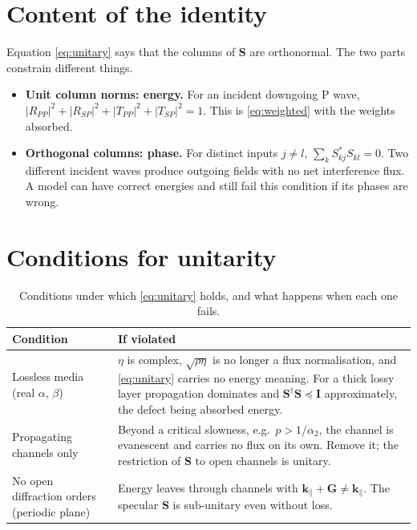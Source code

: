\documentclass[11pt,a4paper]{article}
\newcommand{\bI}{\mathbf{I}}
\newcommand{\bS}{\mathbf{S}}
\newcommand{\kpar}{\mathbf{k}_{\parallel}}
\newcommand{\herm}{^{\dagger}}
\begin{document}
\section{Content of the identity}
\label{sec:content}

Equation \eqref{eq:unitary} says that the columns of $\bS$ are
orthonormal. The two parts constrain different things.

\begin{itemize}
\item \textbf{Unit column norms: energy.} For an incident downgoing P
  wave, $|R_{PP}|^2 + |R_{SP}|^2 + |T_{PP}|^2 + |T_{SP}|^2 = 1$. This is
  \eqref{eq:weighted} with the weights absorbed.
\item \textbf{Orthogonal columns: phase.} For distinct inputs $j \neq
  l$, $\sum_k S_{kj}^{*} S_{kl} = 0$. Two different incident waves
  produce outgoing fields with no net interference flux. A model can
  have correct energies and still fail this condition if its phases are
  wrong.
\end{itemize}

\section{Conditions for unitarity}
\label{sec:conditions}

\begin{table}[h]
\centering
\caption{Conditions under which \eqref{eq:unitary} holds, and what
happens when each one fails.}
\label{tab:conditions}
\begin{tabular}{>{\raggedright}p{} >{\raggedright\arraybackslash}p{}}
\toprule
Condition & If violated \\
\midrule
Lossless media (real $\alpha$, $\beta$)
  & $\eta$ is complex, $\sqrt{\rho\eta}$ is no longer a flux
    normalisation, and \eqref{eq:unitary} carries no energy meaning.
    For a thick lossy layer propagation dominates and
    $\bS\herm\bS \preceq \bI$ approximately, the defect being absorbed
    energy. \\[0.4em]
Propagating channels only
  & Beyond a critical slowness, e.g.\ $p > 1/\alpha_2$, the channel is
    evanescent and carries no flux on its own. Remove it; the
    restriction of $\bS$ to open channels is unitary. \\[0.4em]
No open diffraction orders (periodic plane)
  & Energy leaves through channels with $\kpar + \mathbf{G} \neq
    \kpar$. The specular $\bS$ is sub-unitary even without loss. \\
\bottomrule
\end{tabular}
\end{table}
\end{document}

